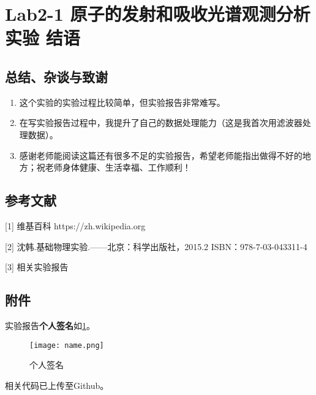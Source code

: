 \documentclass[dvipsnames, svgnames,a4paper,11pt]{article}
\begin{document}
	
	
	\clearpage
	
	\section{Lab2-1 原子的发射和吸收光谱观测分析实验 \quad\heiti 结语}
	
	\subsection{总结、杂谈与致谢}
	\begin{enumerate}
		\item 这个实验的实验过程比较简单，但实验报告非常难写。
		\item 在写实验报告过程中，我提升了自己的数据处理能力（这是我首次用滤波器处理数据）。
		\item 感谢老师能阅读这篇还有很多不足的实验报告，希望老师能指出做得不好的地方；祝老师身体健康、生活幸福、工作顺利！
	\end{enumerate}
	
	\subsection{参考文献}
	[1] 维基百科 https://zh.wikipedia.org
	
	[2] 沈韩.基础物理实验.——北京：科学出版社，2015.2 ISBN：978-7-03-043311-4
	
	[3] 相关实验报告
	
	
	\subsection{附件}
	
	实验报告\textbf{个人签名}如\cref{fig:name}。
	
	\begin{figure}[htbp]
		\centering
		\texttt{[image: name.png]}
		\caption{个人签名}
		\label{fig:name}
	\end{figure}
	
	
	相关代码已上传至Github。
	
	
	
\end{document}
